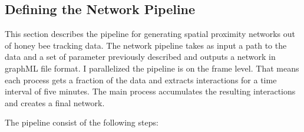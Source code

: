 \subsection{Defining the Network Pipeline}

This section describes the pipeline for generating spatial proximity networks out of honey bee tracking data. The network pipeline takes as input a path to the data and a set of parameter previously described and outputs a network in graphML file format. I parallelized the pipeline is on the frame level. That means each process gets a fraction of the data and extracts interactions for a time interval of five minutes. The main process accumulates the resulting interactions and creates a final network.

The pipeline consist of the following steps:

